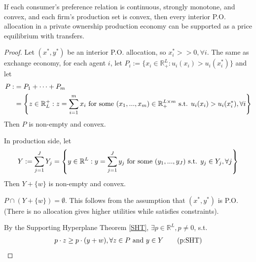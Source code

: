 \documentclass[11pt]{elegantbook}
\begin{document}
\begin{theorem}
    If each consumer's preference relation is continuous, strongly monotone, and convex, and each firm's production set is convex, then every interior P.O. allocation in a private ownership production economy can be supported as a price equilibrium with transfers.
\end{theorem}
\begin{proof}
    Let $(x^*,y^*)$ be an interior P.O. allocation, so $x_i^*>>0, \forall i$. The same as exchange economy, for each agent $i$, let $P_i:=\{x_i\in \mathbb{R}_+^L: u_i(x_i)>u_i(x_i^*)\}$ and let
    \begin{equation}
        \begin{aligned}
            P:&=P_1+\cdots+P_m\\
            &=\left\{z\in \mathbb{R}_L^+: z=\sum_{i=1}^m x_i \textnormal{ for some }(x_1,...,x_m)\in \mathbb{R}_+^{L\times m} \textnormal{ s.t. }u_i(x_i)> u_i(x_i^*), \forall i\right\}
        \end{aligned}
        \nonumber
    \end{equation}
    Then $P$ is non-empty and convex.

    In production side, let
    \begin{equation}
        \begin{aligned}
            Y:=\sum_{j=1}^JY_j=\left\{y\in \mathbb{R}^L:y=\sum_{j=1}^Jy_j \textnormal{ for some }(y_1,...,y_J) \textnormal{ s.t. }y_j\in Y_j, \forall j\right\}
        \end{aligned}
        \nonumber
    \end{equation}
    Then $Y+\{w\}$ is non-empty and convex.
    \begin{claim}
        $P\cap (Y+\{w\})=\emptyset$. This follows from the assumption that $(x^*,y^*)$ is P.O. (There is no allocation gives higher utilities while satisfies constraints).
    \end{claim}
    By the Supporting Hyperplane Theorem \ref{SHT}, $\exists p\in \mathbb{R}^L, p\neq 0$, s.t.
    \begin{equation}
        \begin{aligned}
            p\cdot z\geq p\cdot(y+w), \forall z\in P \textnormal{ and } y\in Y
        \end{aligned}
        \tag{p:SHT}
        \label{SHTp}
    \end{equation}


\end{proof}
\end{document}
